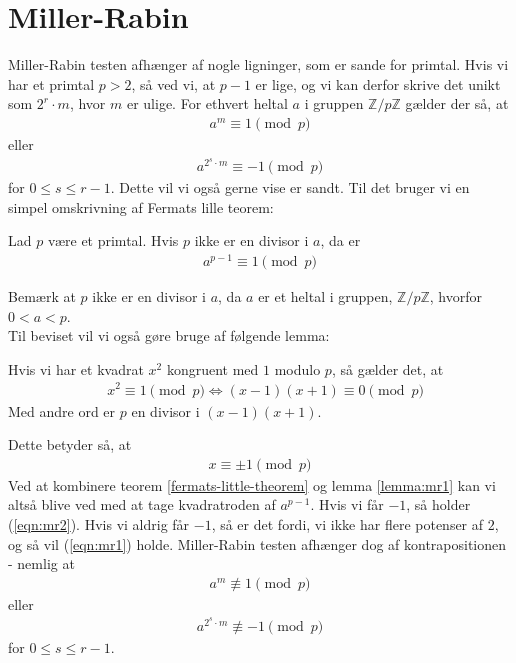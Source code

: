 \documentclass[12pt]{article}
\author{Nikolaj Dybdahl Rathcke}
\begin{document}
\section{Miller-Rabin}
Miller-Rabin testen afhænger af nogle ligninger, som er sande for primtal. Hvis vi har et primtal $p>2$, så ved vi, at $p-1$ er lige, og vi kan derfor skrive det unikt som $2^r \cdot m$, hvor $m$ er ulige. For ethvert heltal $a$ i gruppen $\mathbb{Z}/p\mathbb{Z}$ gælder der så, at
\begin{align}
  a^m \equiv 1 \pmod{p}
  \label{eqn:mr1}
\end{align}
eller
\begin{align}
  a^{2^s \cdot m} \equiv -1 \pmod{p}
  \label{eqn:mr2}
\end{align}
for $0 \leq s \leq r-1$. Dette vil vi også gerne vise er sandt. Til det bruger vi en simpel omskrivning af
Fermats lille teorem:

Lad $p$ være et primtal. Hvis $p$ ikke er en divisor i $a$, da er
\begin{align*}
  a^{p-1} \equiv 1 \pmod{p}
\end{align*}
\label{fermats-little-theorem}

Bemærk at $p$ ikke er en divisor i $a$, da $a$ er et heltal i gruppen, $\mathbb{Z}/p\mathbb{Z}$, hvorfor $0 < a < p$.\\
Til beviset vil vi også gøre bruge af følgende lemma:

Hvis vi har et kvadrat $x^2$ kongruent med $1$ modulo $p$, så gælder det, at
\begin{align*}
  &x^2 \equiv 1 \pmod{p} \iff (x-1)(x+1) \equiv 0 \pmod{p}
\end{align*}
Med andre ord er $p$ en divisor i $(x-1)(x+1)$.
\label{lemma:mr1}

Dette betyder så, at
\begin{align*}
  x \equiv \pm 1 \pmod{p}
\end{align*}
Ved at kombinere teorem \ref{fermats-little-theorem} og lemma \ref{lemma:mr1} kan vi altså blive ved med at tage kvadratroden af $a^{p-1}$.
Hvis vi får $-1$, så holder (\ref{eqn:mr2}). Hvis vi aldrig får $-1$, så er det fordi, vi ikke har flere potenser af $2$, og så vil (\ref{eqn:mr1}) holde.
Miller-Rabin testen afhænger dog af kontrapositionen - nemlig at
\begin{align*}
  a^m \not \equiv 1 \pmod{p}
\end{align*}
eller
\begin{align*}
  a^{2^s \cdot m} \not \equiv -1 \pmod{p}
\end{align*}
for $0\leq s\leq r-1$. 
\end{document}
